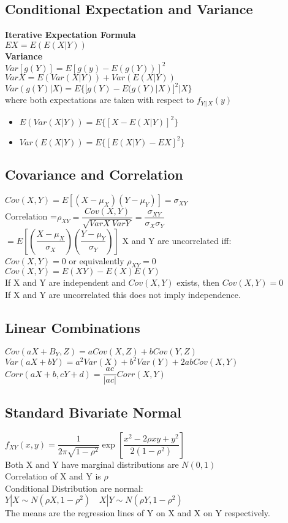 \documentclass{article}
\begin{document}
\begin{flushleft}
\subsection*{Conditional Expectation and Variance}
\textbf{Iterative Expectation Formula}\\
$EX=E(E(X|Y))$\\
\textbf{Variance}\\
$Var[g(Y)]=E[g(y)-E(g(Y))]^2$\medbreak
$VarX=E(Var(X|Y))+Var(E(X|Y))$\\
$Var(g(Y)|X)=E\{[g(Y)-E(g(Y)|X)]^2|X\}$\\
where both expectations are taken with respect to $f_{Y||X}(y)$\\
\begin{itemize}
\item $E(Var(X|Y))=E\{[X-E(X|Y)]^2\}$\\
\item $Var(E(X|Y))=E\{[E(X|Y)-EX]^2\}$\\
\end{itemize}
\subsection*{Covariance and Correlation}
$Cov(X,Y)=E[(X-\mu_X)(Y-\mu_Y)]=\sigma_{XY}$\\
Correlation =$\rho_{XY}=\dfrac{Cov(X,Y)}{\sqrt{VarX \ VarY}}=\dfrac{\sigma_{XY}}{\sigma_X \sigma_Y}$\\
$=E\left[ \left( \dfrac{X-\mu_X}{\sigma_X} \right) \left( \dfrac{Y-\mu_Y}{\sigma_Y} \right) \right]$\medbreak
X and Y are uncorrelated iff:\\
$Cov(X,Y)=0$ or equivalently $\rho_{XY}=0$\\
$Cov(X,Y)=E(XY)-E(X)E(Y)$\\
If X and Y are independent and $Cov(X,Y)$ exists, then $Cov(X,Y)=0$\\
If X and Y are uncorrelated this does not imply independence.\\
\subsection*{Linear Combinations}
$Cov(aX+B_Y,Z)=aCov(X,Z)+bCov(Y,Z)$\medbreak
$Var(aX+bY)=a^2Var(X)+b^2Var(Y)+2abCov(X,Y)$\medbreak
$Corr(aX+b,cY+d)=\dfrac{ac}{|ac|}Corr(X,Y)$

\subsection*{Standard Bivariate Normal}
$f_{XY}(x,y)=\dfrac{1}{2\pi\sqrt{1-\rho^2}}\exp{\left[\dfrac{x^2-2\rho xy+y^2}{2(1-\rho^2)}\right]}$\\
Both X and Y have marginal distributions are $N(0,1)$\\
Correlation of X and Y is $\rho$\\
Conditional Distribution are normal:\\
$Y|X \sim N(\rho X,1-\rho^2) \quad X|Y \sim N(\rho Y, 1-\rho^2)$\\
The means are the regression lines of Y on X and X on Y respectively.

\end{flushleft}
\end{document}
